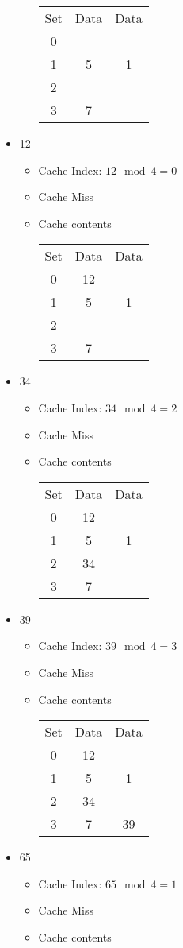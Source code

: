 \documentclass[12pt,letterpaper,twoside]{hmcpset}
\begin{document}
\begin{solution}
\begin{itemize}
\begin{itemize}
  \begin{tabular}{ccc}
    Set & Data & Data\\
    0 &  & \\
    1 & 5 & 1\\
    2 &  & \\
    3 & 7 & 
  \end{tabular}
  \end{itemize}
 \item 12
  \begin{itemize}
  \item Cache Index: $12 \mod{4} = 0$
  \item Cache Miss
  \item Cache contents
  
  \begin{tabular}{ccc}
    Set & Data & Data\\
    0 & 12 & \\
    1 & 5 & 1\\
    2 &  & \\
    3 & 7 & 
  \end{tabular}
  \end{itemize}
\item 34
  \begin{itemize}
  \item Cache Index: $34 \mod{4} = 2$
  \item Cache Miss
  \item Cache contents
  
  \begin{tabular}{ccc}
    Set & Data & Data\\
    0 & 12 & \\
    1 & 5 & 1\\
    2 & 34 & \\
    3 & 7 & 
  \end{tabular}
  \end{itemize}
  \item 39
  \begin{itemize}
  \item Cache Index: $39 \mod{4} = 3$
  \item Cache Miss
  \item Cache contents
  
  \begin{tabular}{ccc}
    Set & Data & Data\\
    0 & 12 & \\
    1 & 5 & 1\\
    2 & 34 & \\
    3 & 7 & 39
  \end{tabular}
  \end{itemize}
  \item 65
  \begin{itemize}
  \item Cache Index: $65 \mod{4} = 1$
  \item Cache Miss
  \item Cache contents
  

\end{itemize}
\end{itemize}
\end{solution}
\end{document}
